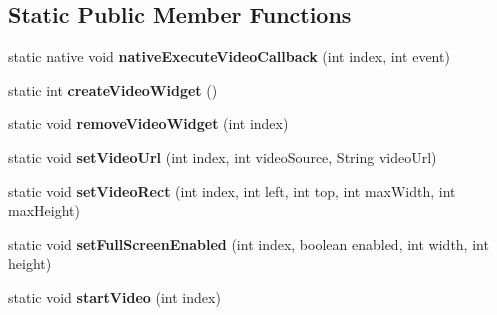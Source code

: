 \subsection*{Static Public Member Functions}
\begin{DoxyCompactItemize}
\item 
\mbox{\label{classorg_1_1cocos2dx_1_1lib_1_1Cocos2dxVideoHelper_acdc75b98349a6874fd29d8d7ecdfcf23}} 
static native void {\bfseries native\+Execute\+Video\+Callback} (int index, int event)
\item 
\mbox{\label{classorg_1_1cocos2dx_1_1lib_1_1Cocos2dxVideoHelper_a94ed06a7410c86c225d6e8dd80fff8b7}} 
static int {\bfseries create\+Video\+Widget} ()
\item 
\mbox{\label{classorg_1_1cocos2dx_1_1lib_1_1Cocos2dxVideoHelper_a8bdfc88257aa026e3ed9d92e5ac2a62f}} 
static void {\bfseries remove\+Video\+Widget} (int index)
\item 
\mbox{\label{classorg_1_1cocos2dx_1_1lib_1_1Cocos2dxVideoHelper_a2f67d3f75f4e9b4a6c13686a8aa047d3}} 
static void {\bfseries set\+Video\+Url} (int index, int video\+Source, String video\+Url)
\item 
\mbox{\label{classorg_1_1cocos2dx_1_1lib_1_1Cocos2dxVideoHelper_af1f59a3f73ec95a9d7f902abda664e14}} 
static void {\bfseries set\+Video\+Rect} (int index, int left, int top, int max\+Width, int max\+Height)
\item 
\mbox{\label{classorg_1_1cocos2dx_1_1lib_1_1Cocos2dxVideoHelper_a50acfd49e5a270fbcd1ed39f7057ecac}} 
static void {\bfseries set\+Full\+Screen\+Enabled} (int index, boolean enabled, int width, int height)
\item 
\mbox{\label{classorg_1_1cocos2dx_1_1lib_1_1Cocos2dxVideoHelper_aab270b59e54b8f53d2bbe7c7a9f43352}} 
static void {\bfseries start\+Video} (int index)
\item 
\mbox{\label{classorg_1_1cocos2dx_1_1lib_1_1Cocos2dxVideoHelper_a7114144479eedf050d28de603883b21a}} 

\end{DoxyCompactItemize}
